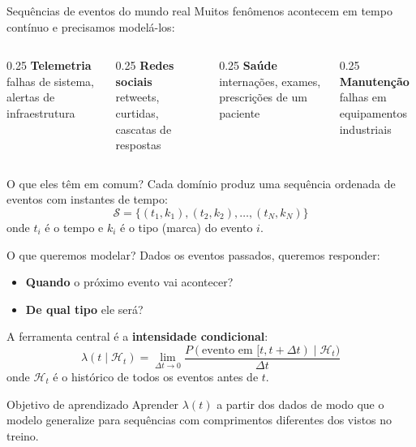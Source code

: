 \documentclass[aspectratio=169,9pt]{beamer}
\begin{document}
\begin{frame}{Sequências de eventos do mundo real}
  Muitos fenômenos acontecem em tempo contínuo e precisamos modelá-los:
  \vspace{0.4em}
  \begin{columns}[T]
    \begin{column}{0.25\textwidth}
      \centering
      \textbf{Telemetria} \\
      \small falhas de sistema, alertas de infraestrutura
    \end{column}
    \begin{column}{0.25\textwidth}
      \centering
      \textbf{Redes sociais} \\
      \small retweets, curtidas, cascatas de respostas
    \end{column}
    \begin{column}{0.25\textwidth}
      \centering
      \textbf{Saúde} \\
      \small internações, exames, prescrições de um paciente
    \end{column}
    \begin{column}{0.25\textwidth}
      \centering
      \textbf{Manutenção} \\
      \small falhas em equipamentos industriais
    \end{column}
  \end{columns}
  \vspace{0.8em}
  \begin{block}{O que eles têm em comum?}
    Cada domínio produz uma sequência ordenada de eventos com instantes de tempo:
    \[
      \mathcal{S} = \{(t_1, k_1), (t_2, k_2), \ldots, (t_N, k_N)\}
    \]
    onde $t_i$ é o tempo e $k_i$ é o tipo (marca) do evento $i$.
  \end{block}
\end{frame}

\begin{frame}{O que queremos modelar?}
  Dados os eventos passados, queremos responder:
  \begin{itemize}
    \item \textbf{Quando} o próximo evento vai acontecer?
    \item \textbf{De qual tipo} ele será?
  \end{itemize}
  \vspace{0.5em}
  A ferramenta central é a \textbf{intensidade condicional}:
  \[
    \lambda(t \mid \mathcal{H}_t) = \lim_{\Delta t \to 0}
      \frac{P(\text{evento em } [t, t+\Delta t) \mid \mathcal{H}_t)}{\Delta t}
  \]
  onde $\mathcal{H}_t$ é o histórico de todos os eventos antes de $t$.
  \vspace{0.5em}
  \begin{block}{Objetivo de aprendizado}
    Aprender $\lambda(t)$ a partir dos dados de modo que o modelo generalize para
    sequências com comprimentos diferentes dos vistos no treino.
  \end{block}
\end{frame}
\end{document}
